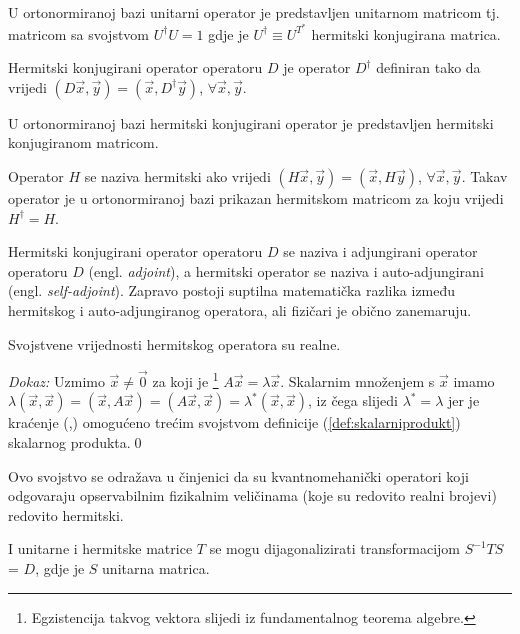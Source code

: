 U ortonormiranoj bazi unitarni operator je predstavljen unitarnom
 matricom tj. matricom sa svojstvom $U^{\dagger}U=1$ gdje je
$U^{\dagger}\equiv U^{T^*}$ hermitski konjugirana matrica.


\begin{definicija}
Hermitski konjugirani operator operatoru $D$ je operator $D^\dagger$
definiran tako da vrijedi $(D\vec{x}, \vec{y})
=(\vec{x}, D^\dagger \vec{y})$, $\forall \vec{x}, \vec{y}$.
\end{definicija}

U ortonormiranoj bazi hermitski konjugirani operator je predstavljen
hermitski konjugiranom matricom.

\begin{definicija}
Operator $H$ se naziva hermitski ako vrijedi $(H\vec{x}, \vec{y})
=(\vec{x}, H \vec{y})$, $\forall \vec{x}, \vec{y}$. Takav operator
je u ortonormiranoj bazi prikazan hermitskom matricom za koju
vrijedi $H^\dagger = H$.
\end{definicija}

Hermitski konjugirani operator operatoru $D$ se naziva i 
adjungirani operator operatoru $D$ (engl. \emph{adjoint}), a hermitski
operator se naziva i auto-adjungirani (engl. \emph{self-adjoint}).
Zapravo postoji suptilna matematička razlika između hermitskog
i auto-adjungiranog operatora, ali fizičari je obično zanemaruju.

\begin{teorem}
Svojstvene vrijednosti hermitskog operatora su realne.
\end{teorem}

\emph{Dokaz:} Uzmimo $\vec{x}\neq \vec{0}$ za koji je%
\footnote{Egzistencija takvog vektora slijedi iz fundamentalnog teorema algebre.}
$A \vec{x} = \lambda \vec{x}$.
Skalarnim množenjem s $\vec{x}$ imamo $\lambda(\vec{x}, \vec{x}) =
(\vec{x}, A\vec{x}) = (A\vec{x},\vec{x}) = \lambda^{\ast}(\vec{x},\vec{x})$,
iz čega slijedi $\lambda^{\ast}=\lambda$ jer je kraćenje (,)
omogućeno trećim svojstvom definicije (\ref{def:skalarniprodukt})
skalarnog produkta.\qed

Ovo svojstvo se odražava u činjenici da su kvantnomehanički operatori koji
odgovaraju opservabilnim fizikalnim veličinama (koje su redovito realni
brojevi) redovito hermitski.

I unitarne i hermitske matrice $T$ se mogu dijagonalizirati trans\-for\-ma\-ci\-jom
$S^{-1} T S$ = $D$, gdje je $S$ unitarna matrica.

